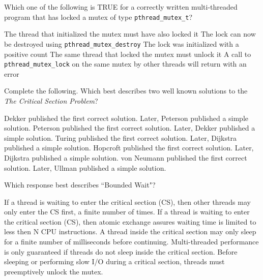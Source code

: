 \variant
Which one of the following is TRUE for a correctly written multi-threaded program that has locked a mutex of type {\tt pthread_mutex_t}?
\begin{answers}
\answer The thread that initialized the mutex must have also locked it
\answer The lock can now be destroyed using {\tt pthread_mutex_destroy} 
\answer The lock was initialized with a positive count
\correctanswer The same thread that locked the mutex must unlock it
\answer A call to {\tt pthread_mutex_lock} on the same mutex by other threads will return with an error
\end{answers}
\begin{solution}
\end{solution}


\variant
Complete the following. Which best describes two well known solutions to the {\em The Critical Section Problem}?
\begin{answers}
\correctanswer Dekker published the first correct solution. Later, Peterson published a simple solution.
\answer Peterson published the first correct solution. Later, Dekker published a simple solution.
\answer Turing published the first correct solution. Later, Dijkstra published a simple solution.
\answer Hopcroft published the first correct solution. Later, Dijkstra published a simple solution. 
\answer von Neumann published the first correct solution. Later, Ullman published a simple solution. 
\end{answers}
\begin{solution}
\end{solution}


\variant
Which response best describes ``Bounded Wait"?
\begin{answers}
\correctanswer If a thread is waiting to enter the critical section (CS), then other threads may only enter the CS first, a finite number of times.
\answer If a thread is waiting to enter the critical section (CS), then atomic exchange assures waiting time is limited to less then N CPU instructions.
\answer A thread inside the critical section may only sleep for a finite number of milliseconds before continuing.
\answer Multi-threaded performance is only guaranteed if threads do not sleep inside the critical section.
\answer Before sleeping or performing slow I/O during a critical section, threads must preemptively unlock the mutex.
\end{answers}
\begin{solution}
\end{solution}


